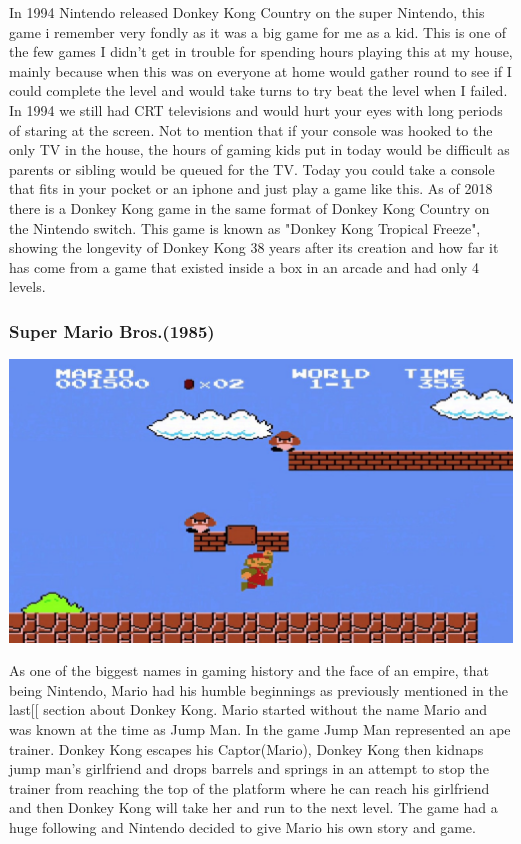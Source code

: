 \documentclass{article}
\begin{document}
In 1994 Nintendo released Donkey Kong Country on the super Nintendo, this game i remember very fondly as it was a big game for me as a kid. This is one of the few games I didn't get in trouble for spending hours playing this at my house, mainly because when this was on everyone at home would gather round to see if I could complete the level and would take turns to try beat the level when I failed. In 1994 we still had CRT televisions and would hurt your eyes with long periods of staring at the screen. Not to mention that if your console was hooked to the only TV in the house, the hours of gaming kids put in today would be difficult as parents or sibling would be queued for the TV. Today you could take a console that fits in your pocket or an iphone and just play a game like this. As of 2018 there is a Donkey Kong game in the same format of Donkey Kong Country on the Nintendo switch. This game is known as "Donkey Kong Tropical Freeze", showing the longevity of Donkey Kong 38 years after its creation and how far it has come from a game that existed inside a box in an arcade and had only 4 levels.

\clearpage

\subsubsection{Super Mario Bros.(1985)}
\begin{minipage}{0.43\textwidth}
\includegraphics[width=\linewidth]{mario}
\end{minipage} \hfill
\begin{minipage}{0.55\textwidth}\raggedright
As one of the biggest names in gaming history and the face of an empire, that being Nintendo, Mario had his humble beginnings as previously mentioned in the last[[
 section about Donkey Kong. Mario started without the name Mario and was known at the time as Jump Man. In the game Jump Man represented an ape trainer. Donkey Kong escapes his Captor(Mario), Donkey Kong then kidnaps jump man's girlfriend and drops barrels and springs in an attempt to stop the trainer from reaching the top of the platform where he can reach his girlfriend and then Donkey Kong will take her and run to the next level. The game had a huge following and Nintendo decided to give Mario his own story and game.
\end{minipage} \newline \newline
\end{document}
